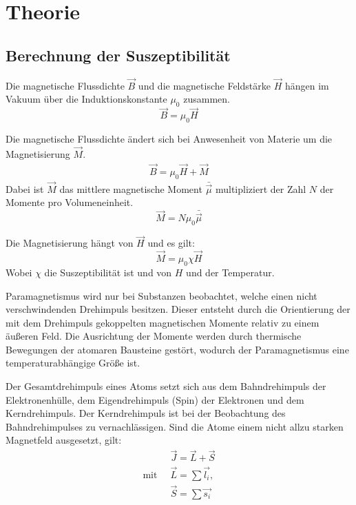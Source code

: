 \section{Theorie}
\label{sec:Theorie}

\subsection{Berechnung der Suszeptibilität}
Die magnetische Flussdichte $\vec{B}$ und die magnetische Feldstärke $\vec{H}$ hängen im Vakuum über die
Induktionskonstante $\mu_0$ zusammen.
\begin{equation}
  \vec{B} = \mu_0 \vec{H}
\end{equation}

Die magnetische Flussdichte ändert sich bei Anwesenheit von Materie um die Magnetisierung $\vec{M}$.
\begin{align}
  \vec{B} = \mu_0 \vec{H} + \vec{M}
\end{align}
Dabei ist $\vec{M}$ das mittlere magnetische Moment $\bar{\vec{\mu}}$ multipliziert der Zahl $N$ der Momente pro
Volumeneinheit.
\begin{equation}
  \vec{M} = N \mu_0 \bar{\vec{\mu}}
\end{equation}

Die Magnetisierung hängt von $\vec{H}$ und es gilt:
\begin{equation}
  \vec{M} = \mu_0 \chi \vec{H}
\end{equation}
Wobei $\chi$ die Suszeptibilität ist und von $H$ und der Temperatur.

Paramagnetismus wird nur bei Substanzen beobachtet, welche einen nicht verschwindenden Drehimpuls besitzen.
Dieser entsteht durch die Orientierung der mit dem Drehimpuls gekoppelten magnetischen
Momente relativ zu einem äußeren Feld. Die Ausrichtung der Momente werden durch thermische Bewegungen
der atomaren Bausteine gestört, wodurch der Paramagnetismus eine temperaturabhängige Größe ist.

Der Gesamtdrehimpuls eines Atoms setzt sich aus dem
Bahndrehimpuls der Elektronenhülle, dem Eigendrehimpuls (Spin) der Elektronen und
dem Kerndrehimpuls. Der Kerndrehimpuls ist bei der Beobachtung des Bahndrehimpulses zu
vernachlässigen. Sind die Atome einem nicht allzu starken Magnetfeld ausgesetzt, gilt:
\begin{align*}
  &\vec{J} = \vec{L} + \vec{S} \\
  \text{mit} \;\; &\vec{L} = \sum \vec{l_i}, \\
  &\vec{S} = \sum \vec{s_i}
\end{align*}

